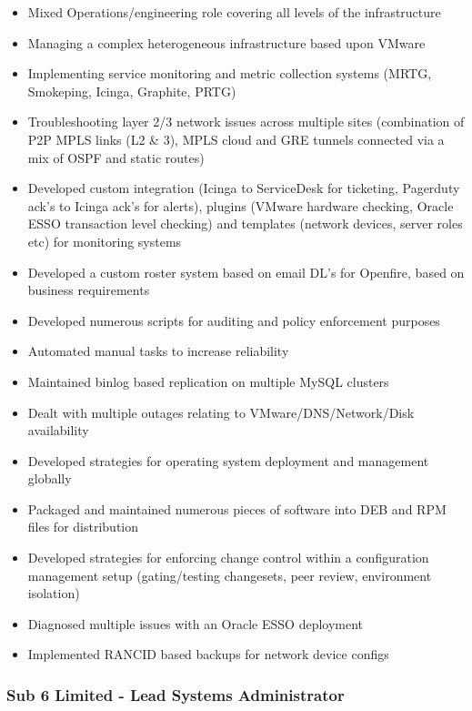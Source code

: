 \begin{itemize}
\tightlist
\item
  Mixed Operations/engineering role covering all levels of the
  infrastructure
\item
  Managing a complex heterogeneous infrastructure based upon VMware
\item
  Implementing service monitoring and metric collection systems (MRTG,
  Smokeping, Icinga, Graphite, PRTG)
\item
  Troubleshooting layer 2/3 network issues across multiple sites
  (combination of P2P MPLS links (L2 \& 3), MPLS cloud and GRE tunnels
  connected via a mix of OSPF and static routes)
\item
  Developed custom integration (Icinga to ServiceDesk for ticketing,
  Pagerduty ack's to Icinga ack's for alerts), plugins (VMware hardware
  checking, Oracle ESSO transaction level checking) and templates
  (network devices, server roles etc) for monitoring systems
\item
  Developed a custom roster system based on email DL's for Openfire,
  based on business requirements
\item
  Developed numerous scripts for auditing and policy enforcement
  purposes
\item
  Automated manual tasks to increase reliability
\item
  Maintained binlog based replication on multiple MySQL clusters
\item
  Dealt with multiple outages relating to VMware/DNS/Network/Disk
  availability
\item
  Developed strategies for operating system deployment and management
  globally
\item
  Packaged and maintained numerous pieces of software into DEB and RPM
  files for distribution
\item
  Developed strategies for enforcing change control within a
  configuration management setup (gating/testing changesets, peer
  review, environment isolation)
\item
  Diagnosed multiple issues with an Oracle ESSO deployment
\item
  Implemented RANCID based backups for network device configs
\end{itemize}

\subsubsection{Sub 6 Limited - Lead Systems
Administrator}\label{sub-6-limited---lead-systems-administrator}

